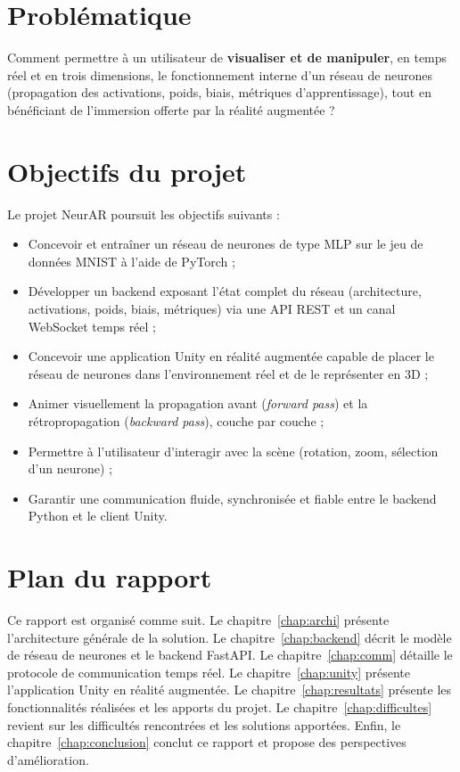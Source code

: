 \documentclass[12pt,a4paper]{report}
\begin{document}
\section{Probl\'ematique}

Comment permettre \`a un utilisateur de \textbf{visualiser et de
manipuler}, en temps r\'eel et en trois dimensions, le fonctionnement
interne d'un r\'eseau de neurones (propagation des activations, poids,
biais, m\'etriques d'apprentissage), tout en b\'en\'eficiant de
l'immersion offerte par la r\'ealit\'e augment\'ee ?

\section{Objectifs du projet}

Le projet NeurAR poursuit les objectifs suivants :

\begin{itemize}
    \item Concevoir et entra\^iner un r\'eseau de neurones de type MLP sur le
    jeu de donn\'ees MNIST \`a l'aide de PyTorch ;
    \item D\'evelopper un backend exposant l'\'etat complet du r\'eseau
    (architecture, activations, poids, biais, m\'etriques) via une API REST
    et un canal WebSocket temps r\'eel ;
    \item Concevoir une application Unity en r\'ealit\'e augment\'ee
    capable de placer le r\'eseau de neurones dans l'environnement r\'eel et
    de le repr\'esenter en 3D ;
    \item Animer visuellement la propagation avant (\textit{forward pass})
    et la r\'etropropagation (\textit{backward pass}), couche par couche ;
    \item Permettre \`a l'utilisateur d'interagir avec la sc\`ene
    (rotation, zoom, s\'election d'un neurone) ;
    \item Garantir une communication fluide, synchronis\'ee et fiable entre
    le backend Python et le client Unity.
\end{itemize}

\section{Plan du rapport}

Ce rapport est organis\'e comme suit. Le chapitre~\ref{chap:archi} pr\'esente
l'architecture g\'en\'erale de la solution. Le chapitre~\ref{chap:backend}
d\'ecrit le mod\`ele de r\'eseau de neurones et le backend FastAPI. Le
chapitre~\ref{chap:comm} d\'etaille le protocole de communication temps
r\'eel. Le chapitre~\ref{chap:unity} pr\'esente l'application Unity en
r\'ealit\'e augment\'ee. Le chapitre~\ref{chap:resultats} pr\'esente les
fonctionnalit\'es r\'ealis\'ees et les apports du projet. Le
chapitre~\ref{chap:difficultes} revient sur les difficult\'es rencontr\'ees
et les solutions apport\'ees. Enfin, le chapitre~\ref{chap:conclusion}
conclut ce rapport et propose des perspectives d'am\'elioration.
\end{document}
